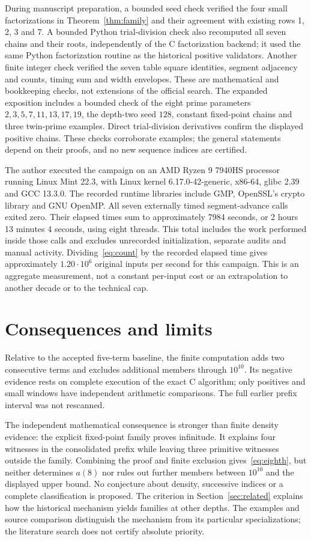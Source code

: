 \documentclass[11pt,a4paper]{article}
\theoremstyle{remark}
\begin{document}
During manuscript preparation, a bounded seed check verified the four small
factorizations in Theorem~\ref{thm:family} and their agreement with existing
rows 1, 2, 3 and 7. A bounded Python trial-division check also recomputed all
seven chains and their roots, independently of the C factorization backend;
it used the same Python factorization routine as the historical positive
validators. Another finite integer check verified the seven table
square identities, segment adjacency and counts, timing sum and width
envelopes. These are mathematical and bookkeeping checks, not extensions
of the official search.
The expanded exposition includes a bounded check of the eight prime
parameters $2,3,5,7,11,13,17,19$, the depth-two seed $128$, constant
fixed-point chains and three twin-prime examples. Direct trial-division
derivatives confirm the displayed positive chains. These checks corroborate
examples; the general statements depend on their proofs, and no new
sequence indices are certified.

The author executed the campaign on an AMD Ryzen 9 7940HS processor running
Linux Mint 22.3, with Linux kernel 6.17.0-42-generic, x86-64, glibc 2.39
and GCC 13.3.0.
The recorded runtime libraries include GMP, OpenSSL's crypto library and
GNU OpenMP. All seven externally timed segment-advance calls exited zero.
Their elapsed times sum to approximately 7984 seconds, or 2 hours 13 minutes
4 seconds, using eight threads. This total includes the work performed
inside those calls and excludes unrecorded initialization, separate audits
and manual activity. Dividing~\eqref{eq:count} by the recorded elapsed time
gives approximately $1.20\cdot10^6$ original inputs per second for this
campaign. This is an aggregate measurement, not a constant per-input cost
or an extrapolation to another decade or to the technical cap.

\section{Consequences and limits}
Relative to the accepted five-term baseline, the finite computation adds
two consecutive terms and excludes additional members through $10^{10}$.
Its negative evidence rests on complete execution of the exact C algorithm;
only positives and small windows have independent arithmetic comparisons.
The full earlier prefix interval was not rescanned.

The independent mathematical consequence is stronger than finite density
evidence: the explicit fixed-point family proves infinitude. It explains
four witnesses in the consolidated prefix while leaving three primitive
witnesses outside the family. Combining the proof and finite exclusion
gives~\eqref{eq:eighth}, but neither determines $a(8)$ nor rules out further
members between $10^{10}$ and the displayed upper bound. No conjecture about density,
successive indices or a complete classification is proposed.
The criterion in Section~\ref{sec:related} explains how the historical
mechanism yields families at other depths. The examples and source
comparison distinguish the mechanism from its particular specializations;
the literature search does not certify absolute priority.
\end{document}
